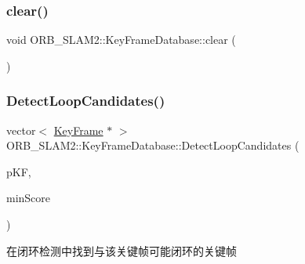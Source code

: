\subsubsection{\texorpdfstring{clear()}{clear()}}
{\footnotesize\ttfamily void O\+R\+B\+\_\+\+S\+L\+A\+M2\+::\+Key\+Frame\+Database\+::clear (\begin{DoxyParamCaption}{ }\end{DoxyParamCaption})}

\mbox{\label{class_o_r_b___s_l_a_m2_1_1_key_frame_database_a2d396aae02c4318ea8c7e7eff8059c69}} 
\subsubsection{\texorpdfstring{Detect\+Loop\+Candidates()}{DetectLoopCandidates()}}
{\footnotesize\ttfamily vector$<$ \mbox{\hyperlink{class_o_r_b___s_l_a_m2_1_1_key_frame}{Key\+Frame}} $\ast$ $>$ O\+R\+B\+\_\+\+S\+L\+A\+M2\+::\+Key\+Frame\+Database\+::\+Detect\+Loop\+Candidates (\begin{DoxyParamCaption}\item[{\mbox{\hyperlink{class_o_r_b___s_l_a_m2_1_1_key_frame}{Key\+Frame}} $\ast$}]{p\+KF,  }\item[{float}]{min\+Score }\end{DoxyParamCaption})}



在闭环检测中找到与该关键帧可能闭环的关键帧 


